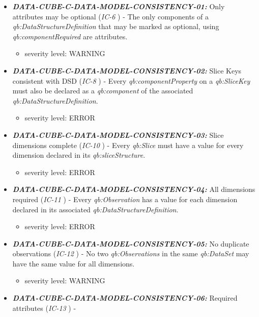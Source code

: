 \documentclass{llncs}
\begin{document}
\begin{itemize}
	\item \textbf{{\em DATA-CUBE-C-DATA-MODEL-CONSISTENCY-01:}}
	Only attributes may be optional (\emph{IC-6} \cite{CyganiakReynolds2014}) - 
	The only components of a \emph{qb:DataStructureDefinition} that may be marked as optional, using \emph{qb:componentRequired} are attributes. 
	\begin{itemize}
		\item severity level: WARNING
	\end{itemize}
	\item \textbf{{\em DATA-CUBE-C-DATA-MODEL-CONSISTENCY-02:}}
	Slice Keys consistent with DSD (\emph{IC-8} \cite{CyganiakReynolds2014}) -
	Every \emph{qb:componentProperty} on a \emph{qb:SliceKey} must also be declared as a \emph{qb:component} of the associated \emph{qb:DataStructureDefinition}. 
	\begin{itemize}
		\item severity level: ERROR
	\end{itemize}
	\item \textbf{{\em DATA-CUBE-C-DATA-MODEL-CONSISTENCY-03:}} 
	Slice dimensions complete (\emph{IC-10} \cite{CyganiakReynolds2014}) - 
	Every \emph{qb:Slice} must have a value for every dimension declared in its \emph{qb:sliceStructure}. 
	\begin{itemize}
		\item severity level: ERROR
	\end{itemize}
		\item \textbf{{\em DATA-CUBE-C-DATA-MODEL-CONSISTENCY-04:}}
	All dimensions required (\emph{IC-11} \cite{CyganiakReynolds2014}) - 
	Every \emph{qb:Observation} has a value for each dimension declared in its associated \emph{qb:DataStructureDefinition}. 
	\begin{itemize}
		\item severity level: ERROR
	\end{itemize}
		\item \textbf{{\em DATA-CUBE-C-DATA-MODEL-CONSISTENCY-05:}}
	No duplicate observations (\emph{IC-12} \cite{CyganiakReynolds2014}) - 
	No two \emph{qb:Observations} in the same \emph{qb:DataSet} may have the same value for all dimensions. 
	\begin{itemize}
		\item severity level: WARNING
	\end{itemize}
	\item \textbf{{\em DATA-CUBE-C-DATA-MODEL-CONSISTENCY-06:}}
	Required attributes (\emph{IC-13} \cite{CyganiakReynolds2014}) -

\end{itemize}
\end{document}
